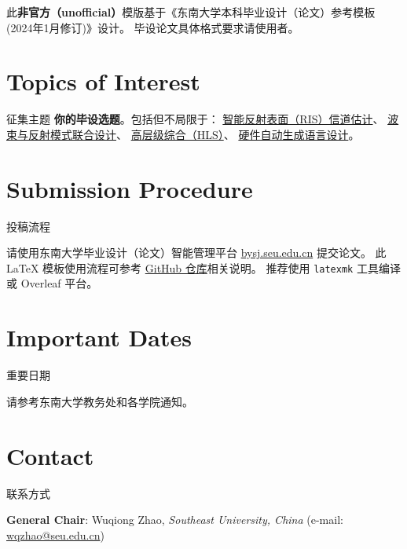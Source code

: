 \documentclass[a4paper, 12pt]{article}
\newcommand\secondColor{seuYellow}
\begin{document}
\begin{warning}
  此\textbf{非官方（unofficial）}模版基于《东南大学本科毕业设计（论文）参考模板 (2024年1月修订)》设计。
  毕设论文具体格式要求请使用者。
\end{warning}

\section{Topics of Interest}{征集主题}
\textbf{你的毕设选题}。包括但不局限于：
\href{https://wqzhao.org/pub/zhao2023ompl}{智能反射表面（RIS）信道估计}、
\href{https://wqzhao.org/pub/you2023beam}{波束与反射模式联合设计}、
\href{https://wqzhao.org/pub/zhao2023flexible}{高层级综合（HLS）}、
\href{https://wqzhao.org/pub/zhao2023automatic}{硬件自动生成语言设计}。

\section{Submission Procedure}{投稿流程}

请使用东南大学毕业设计（论文）智能管理平台 \href{https://bysj.seu.edu.cn}{\ttfamily bysj.seu.edu.cn} 提交论文。
此 \LaTeX{} 模板使用流程可参考 \href{https://github.com/Teddy-van-Jerry/seuthesis2024b}{GitHub 仓库}相关说明。
推荐使用 \texttt{latexmk} 工具编译或 Overleaf 平台。

\section{Important Dates}{重要日期}

请参考东南大学教务处和各学院通知。

\section{Contact}{联系方式}

\noindent
\textbf{General Chair}: Wuqiong Zhao, \textit{Southeast University, China} (e-mail: \href{mailto:wqzhao@seu.edu.cn}{\ttfamily wqzhao@seu.edu.cn})
\end{document}

